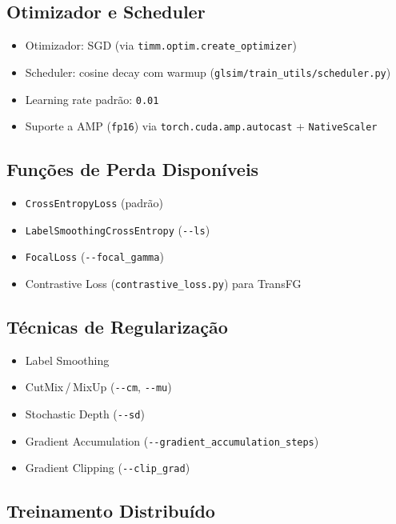 \documentclass[a4paper,12pt]{scrartcl}
\newenvironment{compactitem}%
  {\begin{itemize}\setlength{\itemsep}{1pt}\setlength{\parsep}{0pt}}%
  {\end{itemize}}
\begin{document}
\subsection{Otimizador e Scheduler}

\begin{compactitem}
  \item Otimizador: SGD (via \texttt{timm.optim.create\_optimizer})
  \item Scheduler: cosine decay com warmup
        (\texttt{glsim/train\_utils/scheduler.py})
  \item Learning rate padr\~ao: \texttt{0.01}
  \item Suporte a AMP (\texttt{fp16}) via \texttt{torch.cuda.amp.autocast}
        + \texttt{NativeScaler}
\end{compactitem}

\subsection{Fun\c{c}\~oes de Perda Dispon\'iveis}

\begin{compactitem}
  \item \texttt{CrossEntropyLoss} (padr\~ao)
  \item \texttt{LabelSmoothingCrossEntropy} (\texttt{-{}-ls})
  \item \texttt{FocalLoss} (\texttt{-{}-focal\_gamma})
  \item Contrastive Loss (\texttt{contrastive\_loss.py}) para TransFG
\end{compactitem}

\subsection{T\'ecnicas de Regulariza\c{c}\~ao}

\begin{compactitem}
  \item Label Smoothing
  \item CutMix\,/\,MixUp (\texttt{-{}-cm}, \texttt{-{}-mu})
  \item Stochastic Depth (\texttt{-{}-sd})
  \item Gradient Accumulation
        (\texttt{-{}-gradient\_accumulation\_steps})
  \item Gradient Clipping (\texttt{-{}-clip\_grad})
\end{compactitem}

\subsection{Treinamento Distribu\'ido}
\end{document}
